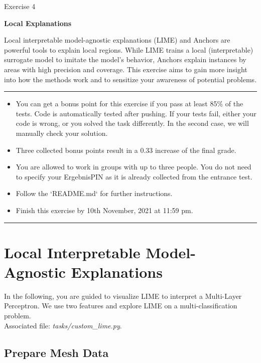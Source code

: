 \documentclass[a4paper]{article}
\begin{document}
{\noindent\LARGE Exercise 4\par}
\vspace{8pt}
{\noindent\huge\textbf{Local Explanations}}
\vspace{20pt}

\noindent
Local interpretable model-agnostic explanations (LIME) and Anchors are powerful tools to explain local regions. While LIME trains a local (interpretable) surrogate model to imitate the model's behavior, Anchors explain instances by areas with high precision and coverage. This exercise aims to gain more insight into how the methods work and to sensitize your awareness of potential problems.


\vspace{10pt}
\par\noindent\rule{\textwidth}{0.2pt}
\begin{itemize}
    \item You can get a bonus point for this exercise if you pass at least 85\% of the tests. Code is automatically tested after pushing. If your tests fail, either your code is wrong, or you solved the task differently. In the second case, we will manually check your solution.
    \item Three collected bonus points result in a 0.33 increase of the final grade.
    \item You are allowed to work in groups with up to three people. You do not need to specify your ErgebnisPIN as it is already collected from the entrance test.
    \item Follow the `README.md` for further instructions.
    \item Finish this exercise by 10th November, 2021 at 11:59 pm.
\end{itemize}
\par\noindent\rule{\textwidth}{0.2pt}
\vspace{8pt}


\section{Local Interpretable Model-Agnostic Explanations}

In the following, you are guided to visualize LIME to interpret a Multi-Layer Perceptron. We use two features and explore LIME on a multi-classification problem.\\

\noindent Associated file: \textit{tasks/custom\_lime.py}.

\subsection{Prepare Mesh Data}
\end{document}
